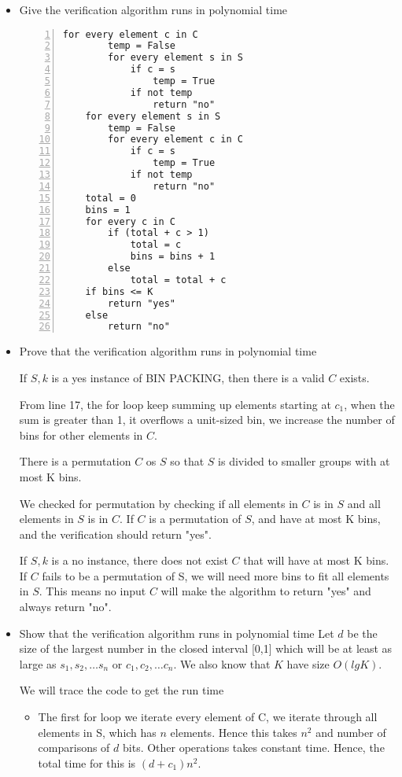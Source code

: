 \documentclass{cpsc413Solutions}
\begin{document}
\begin{problemlist}
\begin{problem}
\begin{answer}
\begin{itemize}
    \item Give the verification algorithm runs in polynomial time
    
    \begin{lstlisting}[numbers=left, mathescape=true]
    for every element c in C
        temp = False
        for every element s in S
            if c = s
                temp = True
            if not temp 
                return "no"
    for every element s in S
        temp = False
        for every element c in C
            if c = s
                temp = True
            if not temp
                return "no"
    total = 0
    bins = 1
    for every c in C
        if (total + c > 1)
            total = c
            bins = bins + 1
        else
            total = total + c
    if bins <= K
        return "yes"
    else
        return "no"
    \end{lstlisting}
    
    \item Prove that the verification algorithm runs in polynomial time
    
    If $S,k$ is a yes instance of BIN PACKING, then there is a valid $C$ exists. 
    
    From line 17, the for loop keep summing up elements starting at $c_1$, when the sum is greater than 1, it overflows a unit-sized bin, we increase the number of bins for other elements in $C$.
    
    There is a permutation $C$ os $S$ so that $S$ is divided to smaller groups with at most K bins.
    
    We checked for permutation by checking if all elements in $C$ is in $S$ and all elements in $S$ is in $C$. If $C$ is a permutation of $S$, and have at most K bins, and the verification should return "yes".
    
    If $S,k$ is a no instance, there does not exist $C$ that will have at most K bins. If $C$ fails to be a permutation of S, we will need more bins to fit all elements in $S$. This means no input $C$ will make the algorithm to return "yes" and always return "no".
    
    \item Show that the verification algorithm runs in polynomial time
    Let $d$ be the size of the largest number in the closed interval [0,1] which will be at least as large as $s_1, s_2, \dots s_n$ or $c_1, c_2, \dots c_n$. We also know that $K$ have size $O(lgK)$.
    
    We will trace the code to get the run time
    \begin{itemize}
        \item The first for loop we iterate every element of C, we iterate through all elements in S, which has $n$ elements. Hence this takes $n^2$ and number of comparisons of $d$ bits. Other operations takes constant time. Hence, the total time for this is $(d+c_1)n^2$.
        

\end{itemize}
\end{itemize}
\end{answer}
\end{problem}
\end{problemlist}
\end{document}
